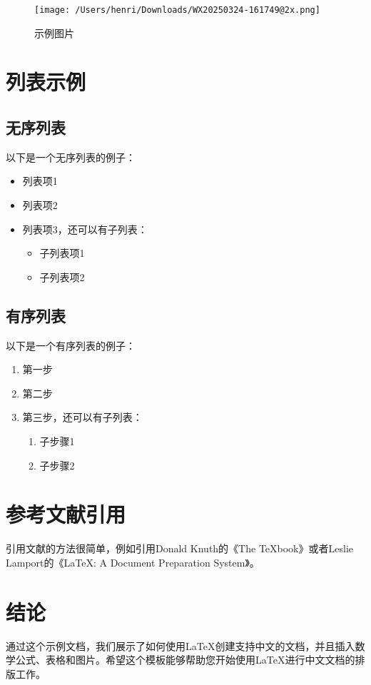 \documentclass[12pt, a4paper]{ctexart} %
\begin{document}
\begin{figure}[htbp]
    \centering
    \texttt{[image: /Users/henri/Downloads/WX20250324-161749@2x.png]}
    \caption{示例图片}
    \label{fig:Hinton 讲座}
\end{figure}

\section{列表示例}
\subsection{无序列表}
以下是一个无序列表的例子：
\begin{itemize}
  \item 列表项1
  \item 列表项2
  \item 列表项3，还可以有子列表：
  \begin{itemize}
    \item 子列表项1
    \item 子列表项2
  \end{itemize}
\end{itemize}

\subsection{有序列表}
以下是一个有序列表的例子：
\begin{enumerate}
  \item 第一步
  \item 第二步
  \item 第三步，还可以有子列表：
  \begin{enumerate}
    \item 子步骤1
    \item 子步骤2
  \end{enumerate}
\end{enumerate}

\section{参考文献引用}
引用文献的方法很简单，例如引用Donald Knuth的《The \TeX book》\cite{knuth1984texbook}或者Leslie Lamport的《\LaTeX: A Document Preparation System》\cite{lamport1994latex}。

\section{结论}
通过这个示例文档，我们展示了如何使用\LaTeX{}创建支持中文的文档，并且插入数学公式、表格和图片。希望这个模板能够帮助您开始使用\LaTeX{}进行中文文档的排版工作。
\end{document}
